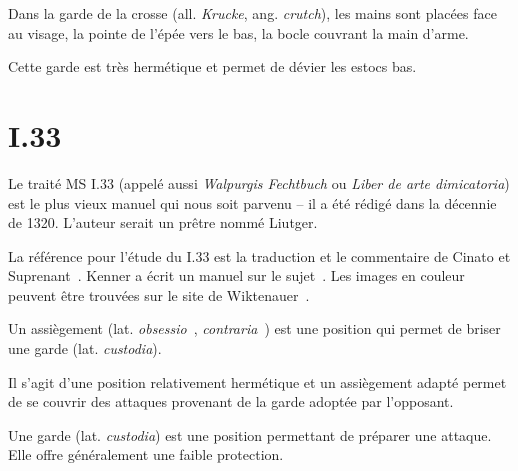 \begin{garde}

Dans la garde de la crosse (all. \emph{Krucke}, ang. \emph{crutch}), les mains sont placées face au visage, la pointe de l'épée vers le bas, la bocle couvrant la main d'arme.

\end{garde}

Cette garde est très hermétique et permet de dévier les estocs bas.


\section{I.33}



Le traité MS I.33 (appelé aussi \emph{Walpurgis Fechtbuch} ou \emph{Liber de arte dimicatoria}) est le plus vieux manuel qui nous soit parvenu – il a été rédigé dans la décennie de 1320.
L'auteur serait un prêtre nommé Liutger.

La référence pour l'étude du I.33 est la traduction et le commentaire de Cinato et Suprenant~\cite{cinato:I33:2009}.
Kenner a écrit un manuel sur le sujet~\cite{kenner:I33:2014}.
Les images en couleur peuvent être trouvées sur le site de Wiktenauer~\cite{wiktenauer:I33}.



\begin{definition}[Assiègement]

Un assiègement (lat. \emph{obsessio}~\cite{cinato:I33:2009}, \emph{contraria}~\cite{kenner:I33:2014}) est une position qui permet de briser une garde (lat. \emph{custodia}).

Il s'agit d'une position relativement hermétique et un assiègement adapté permet de se couvrir des attaques provenant de la garde adoptée par l'opposant.

\end{definition}



\begin{definition}

Une garde (lat. \emph{custodia}) est une position permettant de préparer une attaque.
Elle offre généralement une faible protection.

\end{definition}

